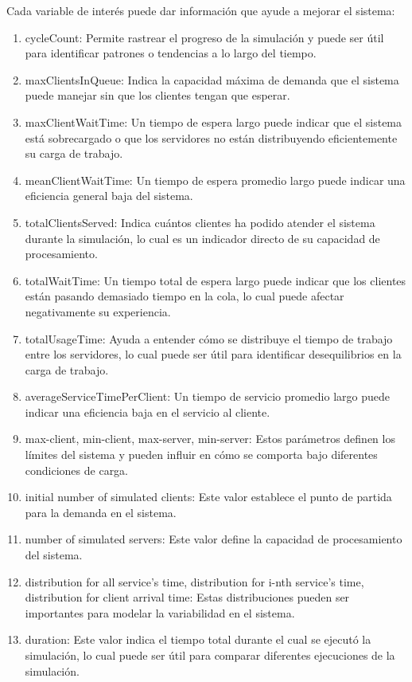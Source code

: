 \documentclass[12pt]{article}
\begin{document}
Cada variable de interés puede dar información que ayude a mejorar el sistema:
\begin{enumerate}
\item cycleCount: Permite rastrear el progreso de la simulación y puede ser útil para identificar patrones o tendencias a lo largo del tiempo.
\item maxClientsInQueue: Indica la capacidad máxima de demanda que el sistema puede manejar sin que los clientes tengan que esperar.
\item maxClientWaitTime: Un tiempo de espera largo puede indicar que el sistema está sobrecargado o que los servidores no están distribuyendo eficientemente su carga de trabajo.
\item meanClientWaitTime: Un tiempo de espera promedio largo puede indicar una eficiencia general baja del sistema.
\item totalClientsServed: Indica cuántos clientes ha podido atender el sistema durante la simulación, lo cual es un indicador directo de su capacidad de procesamiento.
\item totalWaitTime: Un tiempo total de espera largo puede indicar que los clientes están pasando demasiado tiempo en la cola, lo cual puede afectar negativamente su experiencia.
\item totalUsageTime: Ayuda a entender cómo se distribuye el tiempo de trabajo entre los servidores, lo cual puede ser útil para identificar desequilibrios en la carga de trabajo.
\item averageServiceTimePerClient: Un tiempo de servicio promedio largo puede indicar una eficiencia baja en el servicio al cliente.
\item max-client, min-client, max-server, min-server: Estos parámetros definen los límites del sistema y pueden influir en cómo se comporta bajo diferentes condiciones de carga.
\item initial number of simulated clients: Este valor establece el punto de partida para la demanda en el sistema.
\item number of simulated servers: Este valor define la capacidad de procesamiento del sistema.
\item distribution for all service’s time, distribution for i-nth service’s time, distribution for client arrival time: Estas distribuciones pueden ser importantes para modelar la variabilidad en el sistema.
\item duration: Este valor indica el tiempo total durante el cual se ejecutó la simulación, lo cual puede ser útil para comparar diferentes ejecuciones de la simulación.
\end{enumerate}
\end{document}
